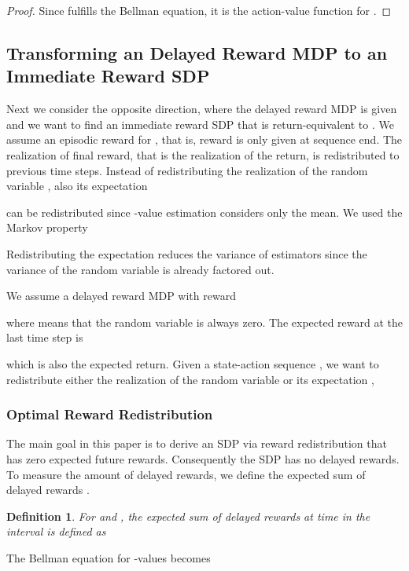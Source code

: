 \documentclass{article}
\newtheorem{definitionA}{Definition}
\begin{document}
\begin{appendices}
\begin{proof}
Since  fulfills the Bellman 
equation, it is the action-value function for .

\end{proof}



\subsection{Transforming an Delayed Reward MDP to an Immediate Reward SDP}
\label{sec:AdelayIm}

Next we consider the opposite direction, where the delayed reward
MDP  is given and we want to find an immediate reward
SDP  that is return-equivalent to .
We assume an episodic reward for , that is, 
reward is only given at sequence end.
The realization of final reward, that is the realization of the return,
 is redistributed 
to previous time steps.
Instead of redistributing the realization  
of the random variable , also its expectation
 
can be redistributed since -value estimation 
considers only the mean.  
We used the Markov property 

Redistributing the expectation reduces the variance of estimators since
the variance of the random variable is already factored out.

We assume a delayed reward MDP  with reward

where  means that the random variable  is always zero.
The expected reward at the last time step is

which is also the expected return.
Given a state-action sequence ,
we want to redistribute either the realization  of the
random variable  or its expectation , 



\subsubsection{Optimal Reward Redistribution}
\label{sec:Aopt_rew_red}

The main goal in this paper is to derive 
an SDP via reward redistribution 
that has zero expected future rewards.
Consequently the SDP has no delayed rewards.
To measure the amount of delayed rewards,
we define the expected sum of delayed rewards .
\begin{definitionA}
For  and ,  
the expected sum of delayed rewards at time  
in the interval  is defined as

\end{definitionA}
The Bellman equation for -values becomes
 

\end{appendices}
\end{document}
